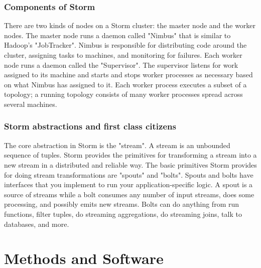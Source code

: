 \documentclass[11pt]{article}
\begin{document}
\subsubsection{Components of Storm}
There are two kinds of nodes on a Storm cluster: the master node and the worker nodes. The master node runs a daemon called "Nimbus" that is similar to Hadoop's "JobTracker". Nimbus is responsible for distributing code around the cluster, assigning tasks to machines, and monitoring for failures. Each worker node runs a daemon called the "Supervisor". The supervisor listens for work assigned to its machine and starts and stops worker processes as necessary based on what Nimbus has assigned to it. Each worker process executes a subset of a topology; a running topology consists of many worker processes spread across several machines. 

\subsubsection{Storm abstractions and first class citizens}
The core abstraction in Storm is the "stream". A stream is an unbounded sequence of tuples. Storm provides the primitives for transforming a stream into a new stream in a distributed and reliable way. The basic primitives Storm provides for doing stream transformations are "spouts" and "bolts". Spouts and bolts have interfaces that you implement to run your application-specific logic. A spout is a source of streams while a bolt consumes any number of input streams, does some processing, and possibly emits new streams. Bolts can do anything from run functions, filter tuples, do streaming aggregations, do streaming joins, talk to databases, and more.

\section{Methods and Software}
\end{document}
